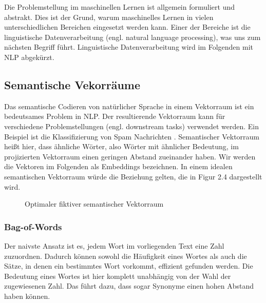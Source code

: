 \documentclass[12pt,letterpaper,ngerman]{article}
\begin{document}
Die Problemstellung im maschinellen Lernen ist allgemein formuliert und abstrakt.
Dies ist der Grund, warum maschinelles Lernen in vielen unterschiedlichen 
Bereichen eingesetzt werden kann. Einer der Bereiche ist die linguistische
Datenverarbeitung (engl. natural language processing), was uns zum nächsten 
Begriff führt. Linguistische Datenverarbeitung wird im Folgenden mit NLP abgekürzt.

\subsection{Semantische Vekorräume}
Das semantische Codieren von natürlicher Sprache in einem Vektorraum 
ist ein bedeutsames Problem in NLP. %
Der resultierende Vektorraum kann
für verschiedene Problemstellungen (engl. downstream tasks) verwendet
werden. Ein Beispiel ist die Klassifizierung von Spam Nachrichten 
\cite{Ball2019}.
Semantischer Vektorraum heißt hier, dass ähnliche Wörter, also Wörter 
mit ähnlicher Bedeutung, im projizierten Vektorraum einen geringen 
Abstand zueinander haben. Wir werden die Vektoren im Folgenden als
Embeddings bezeichnen. In einem idealen semantischen Vektorraum würde 
die Beziehung gelten, die in Figur 2.4 dargestellt wird.
\begin{figure}[H]
  \begin{center}
  \end{center}
  \caption{Optimaler fiktiver semantischer Vektorraum}
\end{figure}
\subsubsection{Bag-of-Words}
Der naivste Ansatz ist es, jedem Wort im vorliegenden Text eine Zahl 
zuzuordnen. Dadurch können sowohl die Häufigkeit eines Wortes als auch
die Sätze, in denen ein bestimmtes Wort vorkommt, effizient gefunden 
werden. Die Bedeutung eines Wortes ist hier komplett unabhängig von 
der Wahl der zugewiesenen Zahl. Das führt dazu, dass sogar Synonyme einen
hohen Abstand haben können.
\end{document}
